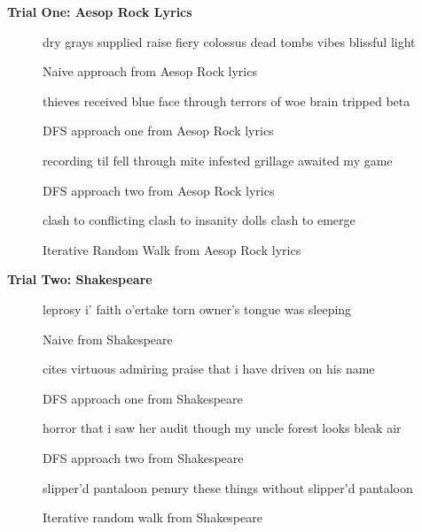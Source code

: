 \documentclass[]{article}
\begin{document}
\begin{center}
\textbf{Trial One: Aesop Rock Lyrics}
\end{center}

\begin{figure}[H]
	\centering
	dry grays supplied raise \break
	fiery colossus dead tombs \break
	vibes blissful light
	\caption{Naive approach from Aesop Rock lyrics}
	\label{fig:NaiveAesop}
\end{figure}

\begin{figure}[H]
	\centering
	thieves received \break
	blue face through terrors of woe \break
	brain tripped beta
	\caption{DFS approach one from Aesop Rock lyrics}
	\label{fig:DFSOneAesop}
\end{figure}

\begin{figure}[H]
	\centering
	recording til fell \break
	through mite infested grillage \break
	awaited my game
	\caption{DFS approach two from Aesop Rock lyrics}
	\label{fig:DFSTwoAesop}
\end{figure}

\begin{figure}[H]
	\centering
	clash to conflicting \break
	clash to insanity dolls \break
	clash to emerge
	\caption{Iterative Random Walk from Aesop Rock lyrics}
		\label{fig:IRWAesop}
	\end{figure}
\begin{center}
\textbf{Trial Two: Shakespeare}
\end{center}

\begin{figure}[H]
	\centering
	leprosy i' faith \break
	o'ertake torn owner's \break
	tongue was sleeping
	\caption{Naive from Shakespeare}
	\label{fig:NaiveShakespeare}
\end{figure}

\begin{figure}[H]
	\centering
	cites virtuous \break
	admiring praise that i have \break
	driven on his name
	\caption{DFS approach one from Shakespeare}
	\label{fig:DPSOneShakespeare}
\end{figure}

\begin{figure}[H]
	\centering
	horror that i saw \break
	her audit though my uncle \break
	forest looks bleak air
	\caption{DFS approach two from Shakespeare}
	\label{fig:DFSTwoShakespeare}
\end{figure}

\begin{figure}[H]
	\centering
	slipper'd pantaloon \break
	penury these things without \break
	slipper'd pantaloon
	\caption{Iterative random walk from Shakespeare}
	\label{fig:IRWShakespeare}
\end{figure}
\end{document}
